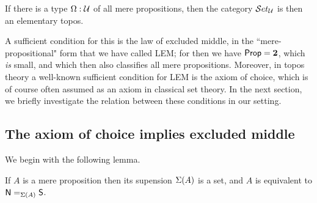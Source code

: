 \begin{thm}\label{thm:settopos}
  If there is a type $\Omega:\UU$ of all mere propositions, then the category $\uset_\UU$ is then an elementary topos.
\end{thm}

A sufficient condition for this is the law of excluded middle, in the ``mere-propositional" form that we have called LEM; for then we have $\prop = \bool$, which \emph{is} small, and which then also classifies all mere propositions.
Moreover, in topos theory a well-known sufficient condition for LEM is the axiom of choice, which is of course often assumed as an axiom in classical set theory.
In the next section, we briefly investigate the relation between these conditions in our setting.


\subsection{The axiom of choice implies excluded middle}
\label{subsec:emacinsets}


We begin with the following lemma.

\begin{lem}\label{prop:trunc_of_prop_is_set}
If $A$ is a mere proposition then its supension $\susp(A)$ is a set,
and $A$ is equivalent to $\id[\susp(A)]{\north}{\south}$.
\end{lem}

